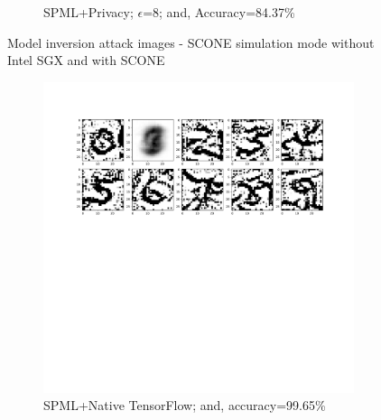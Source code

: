 \begin{figure}
\begin{subfigure}{.325\textwidth}
         \vspace{-8em}
         \caption{SPML+Privacy; $\epsilon$=8; and, Accuracy=84.37\%}
         \label{default}
     \end{subfigure}
        \caption{Model inversion attack images - SCONE simulation mode without Intel SGX and with SCONE}
        \label{default}
\end{figure}

\begin{figure}
     \begin{subfigure}{.325\textwidth}
         \includegraphics[width=\textwidth]{images/Hw_attack/Mnistattack_native.pdf}
         \vspace{-8em}
         \caption{SPML+Native TensorFlow; and, accuracy=99.65\%}
         \label{default}
     \end{subfigure}
     \begin{subfigure}{.325\textwidth}

\end{subfigure}
\end{figure}
